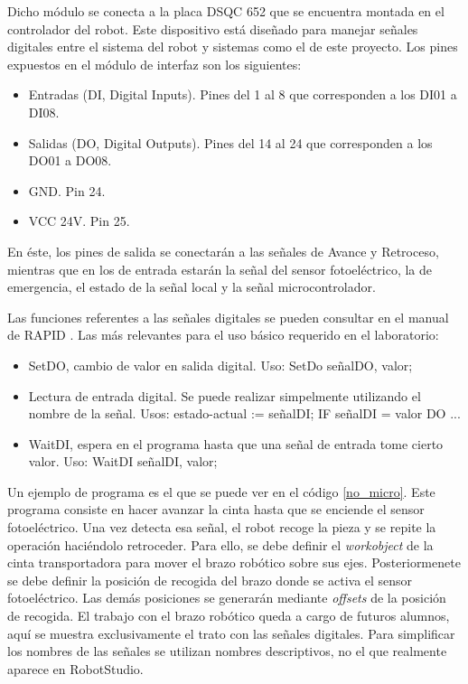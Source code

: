 Dicho módulo se conecta a la placa DSQC 652 que se encuentra montada en el controlador del robot.
Este dispositivo está diseñado para manejar señales digitales entre el sistema del robot y sistemas
como el de este proyecto. Los pines expuestos en el módulo de interfaz son los siguientes:
\begin{itemize}
    \item Entradas (DI, Digital Inputs). Pines del 1 al 8 que corresponden a los DI01 a DI08.
    \item Salidas (DO, Digital Outputs). Pines del 14 al 24 que corresponden a los DO01 a DO08.
    \item GND. Pin 24.
    \item VCC 24V. Pin 25.
\end{itemize}

En éste, los pines de salida se conectarán a las señales de Avance y Retroceso, mientras que en los de entrada estarán la señal del sensor fotoeléctrico, la de emergencia, el estado de la señal local y la señal microcontrolador.

Las funciones referentes a las señales digitales se pueden consultar en el manual de RAPID \cite{rapid}.
Las más relevantes para el uso básico requerido en el laboratorio:
\begin{itemize}
    \item SetDO, cambio de valor en salida digital. Uso: SetDo señalDO, valor;
    \item Lectura de entrada digital. Se puede realizar simpelmente utilizando el nombre de la señal. 
    Usos: estado-actual := señalDI; IF señalDI = valor DO ...
    \item WaitDI, espera en el programa hasta que una señal de entrada tome cierto valor.
    Uso: WaitDI señalDI, valor;
\end{itemize}

Un ejemplo de programa es el que se puede ver en el código \ref{no_micro}. Este programa consiste en hacer avanzar
la cinta hasta que se enciende el sensor fotoeléctrico.
Una vez detecta esa señal, el robot recoge la pieza y se repite la operación 
haciéndolo retroceder. Para ello, se debe definir el \textit{workobject} de la cinta transportadora para mover
el brazo robótico sobre sus ejes. Posteriormenete se debe definir la posición de recogida del brazo donde 
se activa el sensor fotoeléctrico. Las demás posiciones se generarán mediante \emph{offsets} de la posición de recogida.
El trabajo con el brazo robótico queda a cargo de futuros alumnos, aquí se muestra exclusivamente el trato 
con las señales digitales. Para simplificar los nombres de las señales se utilizan nombres descriptivos, no
el que realmente aparece en RobotStudio.

